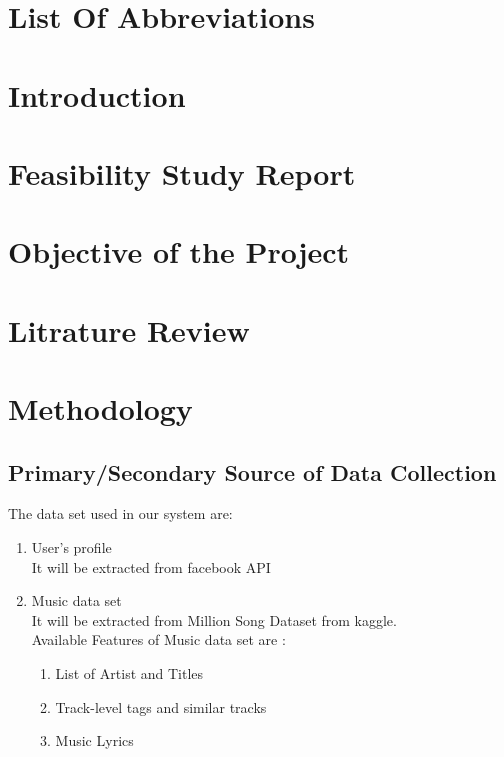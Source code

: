 \documentclass{article}
\begin{document}
\listoffigures
\thispagestyle{empty}
\cleardoublepage

\section*{List Of Abbreviations}
\thispagestyle{empty}
\cleardoublepage

\section{Introduction}
\cleardoublepage

\section{Feasibility Study Report}
\cleardoublepage

\section{Objective of the Project}
\cleardoublepage

\section{Litrature Review}
\cleardoublepage

\section{Methodology}
\cleardoublepage

\subsection{Primary/Secondary Source of Data Collection}
The data set used in our system are:
\begin{enumerate}
\item User's profile\\
  It will be extracted from facebook API
\item Music data set\\
  It will be extracted from Million Song Dataset from kaggle. \\
  Available Features of Music data set are :
  \begin{enumerate}
  \item List of Artist and Titles
  \item Track-level tags and similar tracks
  \item Music Lyrics
  \end{enumerate}
\end{enumerate}
\cleardoublepage
\end{document}
